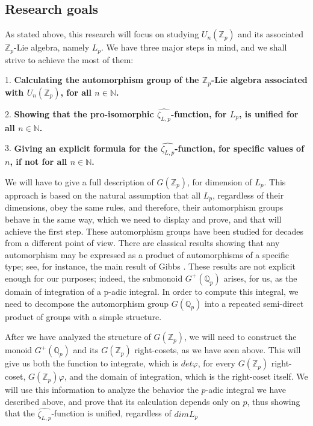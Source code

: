 \documentclass[12pt]{article}
\begin{document}
\subsection{Research goals}
As stated above, this research will focus on studying $U_n(\mathbb{Z}_p)$ and its associated $\mathbb{Z}_p$-Lie algebra, namely $L_p$. We have three major steps in mind, and we shall strive to achieve the most of them:\par
1. \textbf{Calculating the automorphism group of the $\mathbb{Z}_p$-Lie algebra associated with $U_n(\mathbb{Z}_p)$, for all $n\in\mathbb{N}$.}\par
2. \textbf{Showing that the pro-isomorphic $\hat{\zeta_{L,p}}$-function, for $L_p$, is unified for all $n\in\mathbb{N}$.}\par
3. \textbf{Giving an explicit formula for the $\hat{\zeta_{L,p}}$-function, for specific values of $n$, if not for all $n\in\mathbb{N}$.}\par
We will have to give a full description of $G(\mathbb{Z}_p)$, for dimension of $L_p$. This approach is based on the natural assumption that all $L_p$, regardless of their dimensions, obey the same rules, and therefore, their automorphism groups behave in the same way, which we need to display and prove, and that will achieve the first step.
These automorphism groups have been studied for decades from a different point of view.  There are classical results showing that any automorphism may be expressed as a product of automorphisms of a specific type; see, for instance, the main result of Gibbs \cite{Gibbs}.  These results are not explicit enough for our purposes; indeed, the submonoid $G^+(\mathbb{Q}_p)$ arises, for us, as the domain of integration of a p-adic integral.  In order to compute this integral, we need to decompose the automorphism group $G(\mathbb{Q}_p)$ into a repeated semi-direct product of groups with a simple structure.
\par
After we have analyzed the structure of $G(\mathbb{Z}_p)$, we will need to construct the monoid $G^{+}(\mathbb{Q}_p)$ and its $G(\mathbb{Z}_p)$ right-cosets, as we have seen above. This will give us both the function to integrate, which is $det\varphi$, for every $G(\mathbb{Z}_p)$ right-coset, $G(\mathbb{Z}_p)\varphi$, and the domain of integration, which is the right-coset itself. We will use this information to analyze the behavior the $p$-adic integral we have described above, and prove that its calculation depends only on $p$, thus showing that the $\hat{\zeta_{L,p}}$-function is unified, regardless of $dimL_p$
\end{document}
